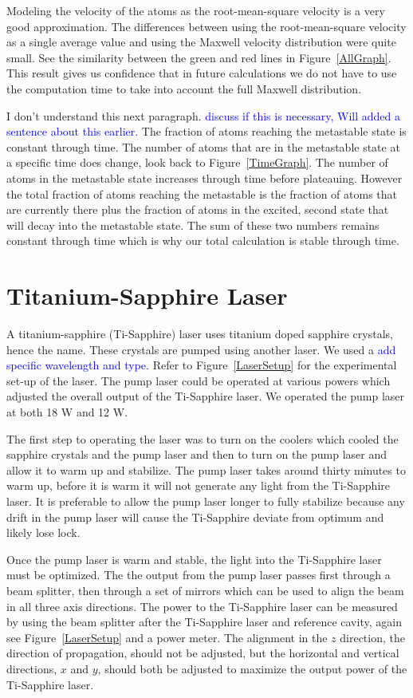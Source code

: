 \documentclass[prb,preprint]{revtex4-1}
\begin{document}
Modeling the velocity of the atoms as the root-mean-square velocity is a very good approximation. The differences between using the root-mean-square velocity as a single average value and using the Maxwell velocity distribution were quite small. See the similarity between the green and red lines in Figure~\ref{AllGraph}.  This result gives us confidence that in future calculations we do not have to use the computation time to take into account the full Maxwell distribution.

I don't understand this next paragraph. \textcolor{blue}{discuss if this is necessary, Will added a sentence about this earlier.}
The fraction of atoms reaching the metastable state is constant through time. The number of atoms that are in the metastable state at a specific time does change, look back to Figure~\ref{TimeGraph}. The number of atoms in the metastable state increases through time before plateauing. However the total fraction of atoms reaching the metastable is the fraction of atoms that are currently there plus the fraction of atoms in the excited, second state that will decay into the metastable state. The sum of these two numbers remains constant through time which is why our total calculation is stable through time.
  

\section{Titanium-Sapphire Laser}

A titanium-sapphire (Ti-Sapphire) laser uses titanium doped sapphire crystals, hence the name. These crystals are pumped using another laser. We used a \textcolor{blue}{add specific wavelength and type.} Refer to Figure~\ref{LaserSetup} for the experimental set-up of the laser. The pump laser could be operated at various powers which adjusted the overall output of the Ti-Sapphire laser. We operated the pump laser at both 18 W and 12 W.

The first step to operating the laser was to turn on the coolers which cooled the sapphire crystals and the pump laser and then to turn on the pump laser and allow it to warm up and stabilize. The pump laser takes around thirty minutes to warm up, before it is warm it will not generate any light from the Ti-Sapphire laser. It is preferable to allow the pump laser longer to fully stabilize because any drift in the pump laser will cause the Ti-Sapphire deviate from optimum and likely lose lock.

Once the pump laser is warm and stable, the light into the Ti-Sapphire laser must be optimized. The the output from the pump laser passes first through a beam splitter, then through a set of mirrors which can be used to align the beam in all three axis directions. The power to the Ti-Sapphire laser can be measured by using the beam splitter after the Ti-Sapphire laser and reference cavity, again see Figure~\ref{LaserSetup} and a power meter. The alignment in the $z$ direction, the direction of propagation, should not be adjusted, but the horizontal and vertical directions, $x$ and $y$, should both be adjusted to maximize the output power of the Ti-Sapphire laser. 
\end{document}
